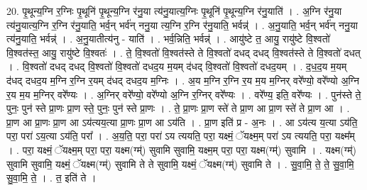 \documentclass[17pt]{extarticle}
\begin{document}
20. पृ॒थून्य॒ग्नि र॒ग्निः पृ॒थूनि॑ पृ॒थून्य॒ग्नि र॑नु॒या त्य॑नु॒यात्य॒ग्निः पृ॒थूनि॑ पृ॒थून्य॒ग्नि र॑नु॒याति॑ । . अ॒ग्नि र॑नु॒या त्य॑नु॒यात्य॒ग्नि र॒ग्नि र॑नु॒याति॒ भर्व॒न् भर्व॑न् ननु॒या त्य॒ग्नि र॒ग्नि र॑नु॒याति॒ भर्वन्न्॑ । . अ॒नु॒याति॒ भर्व॒न् भर्व॑न् ननु॒या त्य॑नु॒याति॒ भर्वन्न्॑ । . अ॒नु॒यातीत्य॑नु - याति॑ । . भर्व॒न्निति॒ भर्वन्न्॑ । . आयु॑ष्टे त॒ आयु॒ रायु॑ष्टे वि॒श्वतो॑ वि॒श्वत॑स्त॒ आयु॒ रायु॑ष्टे वि॒श्वतः॑ । . ते॒ वि॒श्वतो॑ वि॒श्वत॑स्ते ते वि॒श्वतो॑ दधद् दधद् वि॒श्वत॑स्ते ते वि॒श्वतो॑ दधत् । . वि॒श्वतो॑ दधद् दधद् वि॒श्वतो॑ वि॒श्वतो॑ दधद॒य म॒यम् द॑धद् वि॒श्वतो॑ वि॒श्वतो॑ दधद॒यम् । . द॒ध॒द॒य म॒यम् द॑धद् दधद॒य म॒ग्नि र॒ग्नि र॒यम् द॑धद् दधद॒य म॒ग्निः । . अ॒य म॒ग्नि र॒ग्नि र॒य म॒य म॒ग्निर् वरे᳚ण्यो॒ वरे᳚ण्यो अ॒ग्नि र॒य म॒य म॒ग्निर् वरे᳚ण्यः । . अ॒ग्निर् वरे᳚ण्यो॒ वरे᳚ण्यो अ॒ग्नि र॒ग्निर् वरे᳚ण्यः । . वरे᳚ण्य॒ इति॒ वरे᳚ण्यः । . पुन॑स्ते ते॒ पुनः॒ पुन॑ स्ते प्रा॒णः प्रा॒ण स्ते॒ पुनः॒ पुन॑ स्ते प्रा॒णः । . ते॒ प्रा॒णः प्रा॒ण स्ते॑ ते प्रा॒ण आ प्रा॒ण स्ते॑ ते प्रा॒ण आ । . प्रा॒ण आ प्रा॒णः प्रा॒ण आ ऽय॑त्यय॒त्या प्रा॒णः प्रा॒ण आ ऽय॑ति । . प्रा॒ण इति॑ प्र - अ॒नः । . आ ऽय॑त्य य॒त्या ऽय॑ति॒ परा॒ परा॑ ऽय॒त्या ऽय॑ति॒ परा᳚ । . अ॒य॒ति॒ परा॒ परा॑ ऽय त्ययति॒ परा॒ यक्ष्मं॒ ॅयक्ष्म॒म् परा॑ ऽय त्ययति॒ परा॒ यक्ष्म᳚म् । . परा॒ यक्ष्मं॒ ॅयक्ष्म॒म् परा॒ परा॒ यक्ष्म(ग्म्॑) सुवामि सुवामि॒ यक्ष्म॒म् परा॒ परा॒ यक्ष्म(ग्म्॑) सुवामि । . यक्ष्म(ग्म्॑) सुवामि सुवामि॒ यक्ष्मं॒ ॅयक्ष्म(ग्म्॑) सुवामि ते ते सुवामि॒ यक्ष्मं॒ ॅयक्ष्म(ग्म्॑) सुवामि ते । . सु॒वा॒मि॒ ते॒ ते॒ सु॒वा॒मि॒ सु॒वा॒मि॒ ते॒ । . त॒ इति॑ ते । \newline
\end{document}
